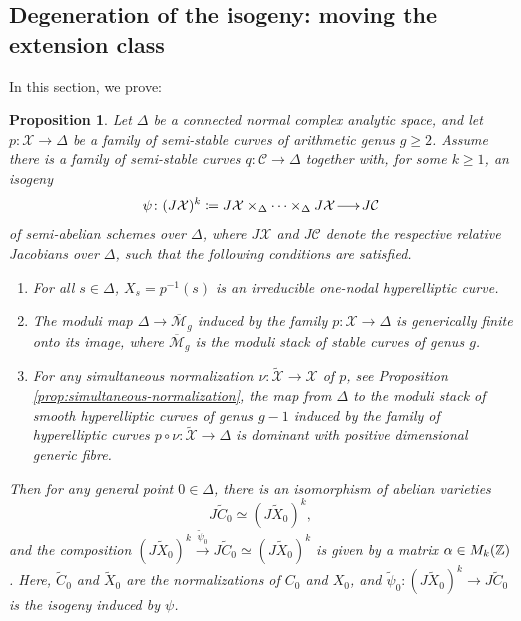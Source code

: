 \documentclass[a4paper,11pt,reqno]{amsart}
\makeatletter
\numberwithin{equation}{section}
\theoremstyle{plain}
\newtheorem{proposition}[theorem]{Proposition}
\theoremstyle{definition}
\newcommand{\Z}{\mathbb Z}
\let\rm\relax
\newcommand{\rm}[1]{{\mathrm{#1}}}
\newcommand{\ca}[1]{{\mathcal{#1}}}
\newcommand{\wt}[1]{{\widetilde{#1}}}
\renewcommand{\longrightarrow}{\xymatrix@1@=15pt{\ar[r]&}}
\renewcommand{\cong}{\simeq}
\makeatother
\begin{document}
\subsection{Degeneration of the isogeny: moving the extension class} In this section, we prove:  
    \begin{proposition} \label{proposition:degenerate-isogeny:moving-extension}
    Let $\Delta$ be a connected normal complex analytic space, and let $
p \colon \ca X \to \Delta
$ be a family of semi-stable curves
of arithmetic genus $g \geq 2$. 
Assume there is a family of semi-stable curves $q \colon \mathcal C\to \Delta$ together with, for some $k\geq 1$, an isogeny
\[
\psi \colon (J\mathcal X)^k \coloneqq 
J\mathcal X\times_\Delta\dots \times_\Delta J\mathcal X\longrightarrow J\mathcal C
\]
of semi-abelian schemes over $\Delta$, where $J\mathcal X$ and $J\mathcal C$ denote the respective relative Jacobians over $\Delta$, such that the following conditions are satisfied. 
    \begin{enumerate}[label=(\Roman*)] 
    \item \label{item:prop-constant-normalization:1}
    For all $s \in \Delta$, $X_s= p^{-1}(s)$ is an irreducible one-nodal hyperelliptic curve. 
    \item \label{item:prop-constant-normalization:2}  
    The moduli map $\Delta \to \overline{\ca M}_g$ induced by the family $p \colon \ca X \to \Delta$ is generically finite onto its image, where $\overline{\ca M}_g$ is the moduli stack of stable curves of genus $g$. 
\item \label{item:prop-constant-normalization:3}  
   For any simultaneous normalization $\nu \colon \wt{\ca X} \to \ca X$ of $p$, see Proposition \ref{prop:simultaneous-normalization}, the map from $ \Delta$ to the moduli stack of smooth hyperelliptic curves of genus $g-1$ induced by the family of hyperelliptic curves $p \circ \nu \colon \wt{\ca X} \to \Delta$ is dominant with positive dimensional generic fibre.
\end{enumerate} Then for any general point $0 \in \Delta$, there is an isomorphism of abelian varieties \[J\wt C_{0} \cong (J\wt X_{0})^k,\] and the composition $(J\wt X_{0})^k \xrightarrow{\wt \psi_0} J\wt C_{0} \cong (J\wt X_{0})^k$  
is given by a matrix $\alpha \in \rm{M}_k(\Z)$. Here, $\wt C_0$ and $\wt X_0$ are the normalizations of $C_0$ and $X_0$, and $\wt \psi_0 \colon (J \wt X_0)^k \to J\wt C_0$ is the isogeny induced by $\psi$.  
    \end{proposition}
    
\end{document}
